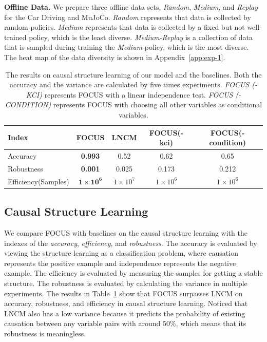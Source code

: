 \documentclass{article}
\theoremstyle{plain}
\theoremstyle{definition}
\theoremstyle{remark}
\begin{document}
\textbf{Offline Data.}
We prepare three offline data sets, \textit{Random}, \textit{Medium}, and \textit{Replay} for the Car Driving and MuJoCo. 
\textit{Random} represents that data is collected by random policies.
\textit{Medium} represents that data is collected by a fixed but not well-trained policy, which is the least diverse.
\textit{Medium-Replay} is a collection of data that is sampled during training the \textit{Medium} policy, which is the most diverse.
The heat map of the data diversity is shown in Appendix~\ref{app:exp-1}.

\vskip -0.1in
\begin{table}[ht]
\caption{The results on causal structure learning of our model and the baselines. Both the accuracy and the variance are calculated by five times experiments. \textit{FOCUS (-KCI)} represents FOCUS with a linear independence test. \textit{FOCUS (-CONDITION)} represents FOCUS with choosing all other variables as conditional variables.}
\label{table-cd}
\vskip -0.2in
\begin{center}
\begin{small}
\begin{sc}
\begin{tabular}{lcccc}
\toprule
Index         & FOCUS & LNCM & FOCUS(-kci)& FOCUS(-condition)  \\
\midrule
Accuracy      & \textbf{0.993}           & 0.52 & 0.62 & 0.65            \\ 
Robustness    & \textbf{0.001}           & 0.025  & 0.173 & 0.212              \\ 
Efficiency(Samples)    & $\textbf{1}\times\textbf{10}^\textbf{6}$           & $1\times10^7$ & $1\times10^6$ & $1\times10^6$                 \\ 
\bottomrule
\end{tabular}
\end{sc}
\end{small}
\end{center}
\vskip -0.1in
\end{table}


\subsection{Causal Structure Learning} 

We compare FOCUS with baselines on the causal structure learning with the indexes of the \textit{accuracy}, \textit{efficiency}, and \textit{robustness}.
The accuracy is evaluated by viewing the structure learning as a classification problem, where causation represents the positive example and independence represents the negative example. 
The efficiency is evaluated by measuring the samples for getting a stable structure.
The robustness is evaluated by calculating the variance in multiple experiments.
The results in Table~\ref{table-cd} show that FOCUS surpasses LNCM on accuracy, robustness, and efficiency in causal structure learning. 
Noticed that LNCM also has a low variance because it predicts the probability of existing causation between any variable pairs with around $50\%$, which means that its robustness is meaningless.
\end{document}
